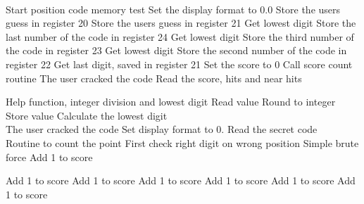 \documentclass[a4paper, landscape]{article}
\begin{document}
\tNewPage

\\
      {Start position code memory test}  
        {Set the display format to 0.0}  
       {Store the users guess in register 20}  
       {}
\tOPmultiplyfo     {} 
       {Store the users guess in register 21}   
       {Get lowest digit} 
       {Store the last number of the code in register 24}
       {Get lowest digit} 
       {Store the third number of the code in register 23}
       {Get lowest digit} 
       {Store the second number of the code in register 22} 
       {Get last digit, saved in register 21} 
        {} 
       {Set the score to 0} 
       {Call score count routine} 
        {} 
       {The user cracked the code} 
       {Read the score, hits and near hits} 

\tNewPage

      {Help function, integer division and lowest digit}
       {Read value} 
       {} 
    {Round to integer} 
       {Store value} 
       {} 
\tOPdividefo       {} 
    {Calculate the lowest digit} 
       {} 
\tOPmultiplyfo     {} 
\\
       {The user cracked the code} 
        {Set display format to 0.} 
       {Read the secret code} 
\\
       {Routine to count the point} 
       {First check right digit on wrong position} 
       {Simple brute force} 
       {Add 1 to score} 
       {} 

\tNewPage

       {} 
       {Add 1 to score} 
       {} 
       {} 
       {Add 1 to score} 
       {} 
       {} 
       {Add 1 to score} 
       {} 
       {} 
       {Add 1 to score} 
       {} 
       {} 
       {Add 1 to score} 
       {} 
       {} 
       {Add 1 to score} 
       {} 
       {} 
\end{document}
